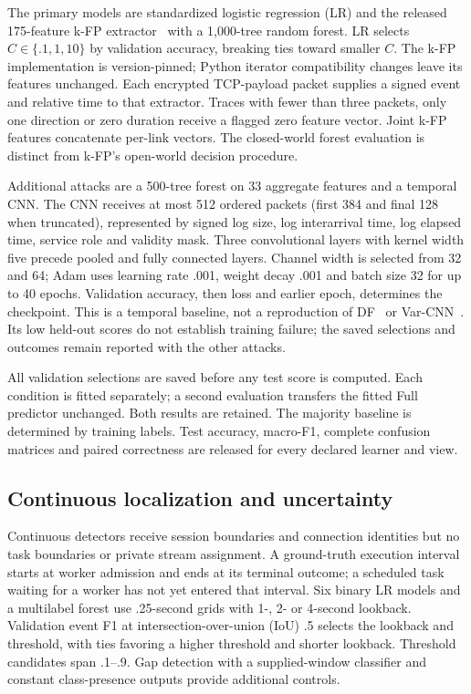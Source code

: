 The primary models are standardized logistic regression (LR) and the released 175-feature k-FP extractor~\cite{hayes2016kfp} with a 1,000-tree random forest. LR selects $C\in\{.1,1,10\}$ by validation accuracy, breaking ties toward smaller $C$. The k-FP implementation is version-pinned; Python iterator compatibility changes leave its features unchanged. Each encrypted TCP-payload packet supplies a signed event and relative time to that extractor. Traces with fewer than three packets, only one direction or zero duration receive a flagged zero feature vector. Joint k-FP features concatenate per-link vectors. The closed-world forest evaluation is distinct from k-FP's open-world decision procedure.

Additional attacks are a 500-tree forest on 33 aggregate features and a temporal CNN. The CNN receives at most 512 ordered packets (first 384 and final 128 when truncated), represented by signed log size, log interarrival time, log elapsed time, service role and validity mask. Three convolutional layers with kernel width five precede pooled and fully connected layers. Channel width is selected from 32 and 64; Adam uses learning rate .001, weight decay .001 and batch size 32 for up to 40 epochs. Validation accuracy, then loss and earlier epoch, determines the checkpoint. This is a temporal baseline, not a reproduction of DF~\cite{sirinam2018df} or Var-CNN~\cite{bhat2019varcnn}. Its low held-out scores do not establish training failure; the saved selections and outcomes remain reported with the other attacks.

All validation selections are saved before any test score is computed. Each condition is fitted separately; a second evaluation transfers the fitted Full predictor unchanged. Both results are retained. The majority baseline is determined by training labels. Test accuracy, macro-F1, complete confusion matrices and paired correctness are released for every declared learner and view.

\subsection{Continuous localization and uncertainty}
Continuous detectors receive session boundaries and connection identities but no task boundaries or private stream assignment. A ground-truth execution interval starts at worker admission and ends at its terminal outcome; a scheduled task waiting for a worker has not yet entered that interval. Six binary LR models and a multilabel forest use .25-second grids with 1-, 2- or 4-second lookback. Validation event F1 at intersection-over-union (IoU) .5 selects the lookback and threshold, with ties favoring a higher threshold and shorter lookback. Threshold candidates span .1--.9. Gap detection with a supplied-window classifier and constant class-presence outputs provide additional controls.

